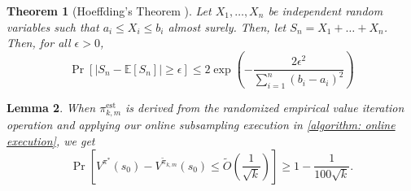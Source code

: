\documentclass{article}
\theoremstyle{plain}
\newtheorem{theorem}{Theorem}[section]
\newtheorem{lemma}[theorem]{Lemma}
\theoremstyle{definition}
\def\est{\mathrm{est}}
\def\E{\mathbb{E}}
\begin{document}
\begin{theorem}[Hoeffding's Theorem \citep{10.5555/1522486}] Let $X_1,\dots,X_n$ be independent random variables such that $a_i\leq X_i\leq b_i$ almost surely. Then, let $S_n = X_1 + \dots + X_n$. Then, for all $\epsilon>0$,
\begin{equation}\Pr[|S_n - \E[S_n]|\geq \epsilon] \leq 2\exp\left(-\frac{2\epsilon^2}{\sum_{i=1}^n (b_i-a_i)^2}\right)\end{equation}
\end{theorem}
\begin{lemma}When ${\pi}^\est_{k,m}$ is derived from the randomized empirical value iteration operation and applying our online subsampling execution in \cref{algorithm: online execution}, we get\label{PDL: stochastic}
    \begin{equation}\Pr\left[V^{\pi^*}(s_0) - V^{\tilde{\pi}_{k,m}}(s_0) \leq \tilde{O}\left(\frac{1}{\sqrt{k}}\right)\right]\geq 1-\frac{1}{100\sqrt{k}}.\end{equation}
    \end{lemma}
\end{document}
